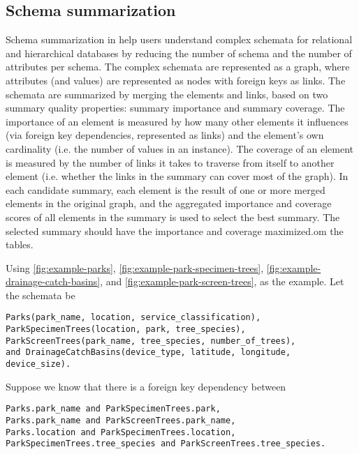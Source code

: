 \subsection{Schema summarization}
\label{ssec:SchemaSummarization}

Schema summarization in \cite{Yu2006Schema} help users understand complex schemata for relational and hierarchical databases by reducing the number of schema and the number of attributes per schema. The complex schemata are represented as a graph, where attributes (and values) are represented as nodes with foreign keys as links. The schemata are summarized by merging the elements and links, based on two summary quality properties: summary importance and summary coverage. The importance of an element is measured by how many other elements it influences (via foreign key dependencies, represented as links) and the element's own cardinality (i.e. the number of values in an instance). The coverage of an element is measured by the number of links it takes to traverse from itself to another element (i.e. whether the links in the summary can cover most of the graph). In each candidate summary, each element is the result of one or more merged elements in the original graph, and the aggregated importance and coverage scores of all elements in the summary is used to select the best summary. The selected summary should have the importance and coverage maximized.om the tables.

Using \autoref{fig:example-parks}, \autoref{fig:example-park-specimen-trees}, \autoref{fig:example-drainage-catch-basins}, and \autoref{fig:example-park-screen-trees}, as the example. Let the schemata be
\begin{lstlisting}
Parks(park_name, location, service_classification),
ParkSpecimenTrees(location, park, tree_species),
ParkScreenTrees(park_name, tree_species, number_of_trees), 
and DrainageCatchBasins(device_type, latitude, longitude, device_size).
\end{lstlisting}

Suppose we know that there is a foreign key dependency between
\begin{lstlisting}
Parks.park_name and ParkSpecimenTrees.park,
Parks.park_name and ParkScreenTrees.park_name,
Parks.location and ParkSpecimenTrees.location,
ParkSpecimenTrees.tree_species and ParkScreenTrees.tree_species.
\end{lstlisting}

